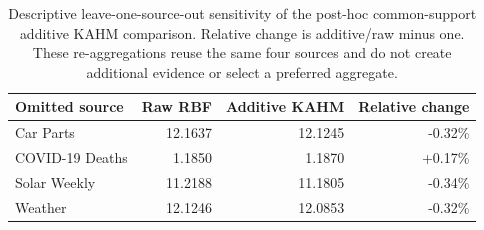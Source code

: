 \begin{table}[!htbp]
\centering\small\setlength{\tabcolsep}{4pt}
\caption{Descriptive leave-one-source-out sensitivity of the post-hoc common-support additive KAHM comparison. Relative change is additive/raw minus one. These re-aggregations reuse the same four sources and do not create additional evidence or select a preferred aggregate.}
\label{tab:utility-leave-one}
\begin{tabular}{lrrr}
\toprule
Omitted source & Raw RBF & Additive KAHM & Relative change \\
\midrule
Car Parts & 12.1637 & 12.1245 & -0.32\%  \\
COVID-19 Deaths & 1.1850 & 1.1870 & +0.17\%  \\
Solar Weekly & 11.2188 & 11.1805 & -0.34\%  \\
Weather & 12.1246 & 12.0853 & -0.32\%  \\
\bottomrule
\end{tabular}
\end{table}

